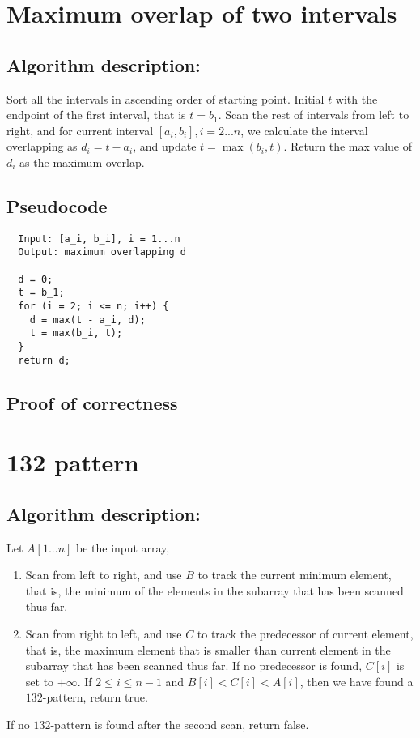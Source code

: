 \documentclass[paper=a4, fontsize=11pt]{scrartcl} %
\numberwithin{equation}{section} %
\numberwithin{figure}{section} %
\numberwithin{table}{section} %
\numberwithin{claimcounter}{section}
\begin{document}
\section{Maximum overlap of two intervals}
\subsection*{Algorithm description:}
Sort all the intervals in ascending order of starting point. Initial $t$ with
the endpoint of the first interval, that is $t = b_1$. Scan the rest of intervals from left to
right, and for current interval $[a_i, b_i], i = 2...n$, we calculate the interval overlapping
as $d_i = t - a_i$, and update $t = \max(b_i, t)$. Return the max value of
$d_i$ as the maximum overlap. 

\subsection*{Pseudocode}
\begin{verbatim}
  Input: [a_i, b_i], i = 1...n
  Output: maximum overlapping d

  d = 0;
  t = b_1;
  for (i = 2; i <= n; i++) {
    d = max(t - a_i, d);
    t = max(b_i, t);
  }
  return d;
\end{verbatim}

\subsection*{Proof of correctness}




\section{132 pattern}
\subsection*{Algorithm description:}
Let $A[1...n]$ be the input array,
\begin{enumerate}
\item Scan from left to right, and use $B$ to track the current minimum element,
that is, the minimum of the elements in the subarray that has been scanned thus 
far.

\item Scan from right to left, and use $C$ to track the predecessor of current
element, that is, the maximum element that is smaller than current element in
the subarray that has been scanned thus far. If no predecessor is found, $C[i]$
is set to $+\infty$. If $2 \leq i \leq n-1$ and $B[i] < C[i] < A[i]$, then we have found a
$132$-pattern, return true. 

\end{enumerate}
If no $132$-pattern is found after the second scan, return false.
\end{document}
